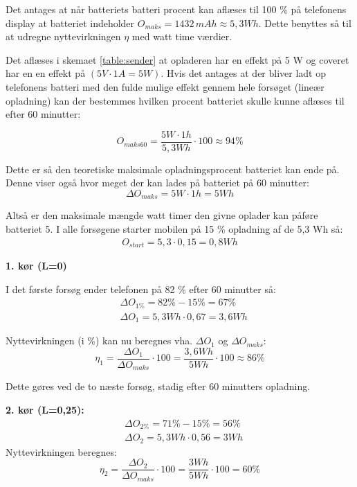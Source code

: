 Det antages at når batteriets batteri procent kan aflæses til 100 \% på telefonens display at batteriet indeholder $O_{maks}=1432\, mAh \approx 5,3 Wh$. Dette benyttes så til at udregne nyttevirkningen $\eta$ med watt time værdier.

Det aflæses i skemaet \ref{table:sender} at opladeren har en effekt på 5 W og coveret har en en effekt på $(5 V \cdot 1 A = 5 W)$. Hvis det antages at der bliver ladt op telefonens batteri med den fulde mulige effekt gennem hele forsøget (lineær opladning) kan der bestemmes hvilken procent batteriet skulle kunne aflæses til efter 60 minutter:

\begin{equation}
O_{maks60}= \frac{5 W\cdot 1h}{5,3Wh} \cdot 100 \approx 94 \%
\label{eq:omaks}
\end{equation}

Dette er så den teoretiske maksimale opladningsprocent batteriet kan ende på. Denne viser også hvor meget der kan lades på batteriet på 60 minutter:
\begin{equation}
\Delta O_{maks} = 5 W \cdot 1 h = 5Wh
\end{equation}

Altså er den maksimale mængde watt timer den givne oplader kan påføre batteriet 5. I alle forsøgene starter mobilen på 15 \% opladning af de 5,3 Wh så:
\begin{align*}
O_{start} = 5,3 \cdot 0,15 = 0,8 Wh
\end{align*}
 

\textbf{1. kør (L=0)}

I det første forsøg ender telefonen på 82 \% efter 60 minutter så:
\begin{align*}
& \Delta O_{1\%} = 82\%-15\% =  67\%  \\
& \Delta O_1 = 5,3 Wh \cdot 0,67 = 3,6 Wh
\end{align*}


Nyttevirkningen (i \%) kan nu beregnes vha. $\Delta O_1$ og $\Delta O_{maks}$:  
\begin{equation}
\eta_1 = \frac{\Delta O_1}{\Delta O_{maks}} \cdot 100 = \frac{3,6 Wh}{5 Wh} \cdot 100 \approx 86 \%
\label{eq:nyt1}
\end{equation}

Dette gøres ved de to næste forsøg, stadig efter 60 minutters opladning.

\textbf{2. kør (L=0,25):}
\begin{align*}
& \Delta O_{2\%} = 71\%-15\% =  56\%  \\
& \Delta O_2 = 5,3 Wh \cdot 0,56 = 3 Wh
\end{align*}
Nyttevirkningen beregnes:
\begin{equation}
\eta_2 = \frac{\Delta O_2}{\Delta O_{maks}} \cdot 100 = \frac{3 Wh}{5 Wh} \cdot 100 = 60 \%
\label{eq:nyt2}
\end{equation}

